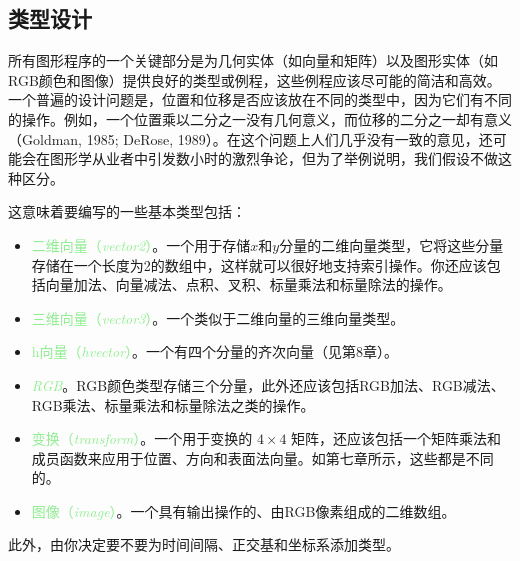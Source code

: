 \documentclass[lang=cn,12pt,marginpar=margintrue]{elegantbook}
\begin{document}

\subsection{类型设计}

所有图形程序的一个关键部分是为几何实体（如向量和矩阵）以及图形实体（如RGB颜色和图像）提供良好的类型或例程，这些例程应该尽可能的简洁和高效。一个普遍的设计问题是，位置和位移是否应该放在不同的类型中，因为它们有不同的操作。例如，一个位置乘以二分之一没有几何意义，而位移的二分之一却有意义（Goldman, 1985; DeRose, 1989）。在这个问题上人们几乎没有一致的意见，还可能会在图形学从业者中引发数小时的激烈争论，但为了举例说明，我们假设不做这种区分。

这意味着要编写的一些基本类型包括：
\begin{itemize}
  \item \textcolor{lightgreen}{二维向量（\textit{vector2}）}。一个用于存储$x$和$y$分量的二维向量类型，它将这些分量存储在一个长度为2的数组中，这样就可以很好地支持索引操作。你还应该包括向量加法、向量减法、点积、叉积、标量乘法和标量除法的操作。
  \item \textcolor{lightgreen}{三维向量（\textit{vector3}）}。一个类似于二维向量的三维向量类型。
  \item \textcolor{lightgreen}{h向量（\textit{hvector}）}。一个有四个分量的齐次向量（见第8章）。
  \item \textcolor{lightgreen}{\textit{RGB}}。RGB颜色类型存储三个分量，此外还应该包括RGB加法、RGB减法、RGB乘法、标量乘法和标量除法之类的操作。
  \item \textcolor{lightgreen}{变换（\textit{transform}）}。一个用于变换的 $4 \times 4$ 矩阵，还应该包括一个矩阵乘法和成员函数来应用于位置、方向和表面法向量。如第七章所示，这些都是不同的。
  \item \textcolor{lightgreen}{图像（\textit{image}）}。一个具有输出操作的、由RGB像素组成的二维数组。
\end{itemize}
此外，由你决定要不要为时间间隔、正交基和坐标系添加类型。

\end{document}
